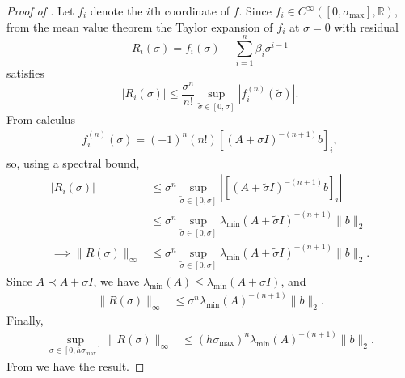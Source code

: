\documentclass[10pt,a4paper]{amsart}
\begin{document}
\begin{proof}[Proof of ]
Let $f_i$ denote the $i$th coordinate of $f$.
Since $f_i \in C^\infty([0,\sigma_{\max}],\mathbb{R})$, from the mean value theorem the Taylor expansion of $f_i$ at $\sigma = 0$ with residual
$$
R_i(\sigma) = f_i(\sigma) - \sum_{ i = 1 }^n \beta_i \sigma^{i-1} 
$$
satisfies 
$$
|R_i(\sigma)| \leq \frac{\sigma^{n}}{n!} \sup_{\tilde{\sigma} \in [0,\sigma]} | f_i^{(n)}(\tilde{\sigma}) |  .
$$
From calculus
\begin{align*}
    f_i^{(n)}(\sigma) = (-1)^n (n!) [ (A + \sigma I)^{-(n+1)} b ]_i ,
\end{align*}
so, using a spectral bound,
\begin{align*}
| R_i(\sigma) | & \leq \sigma^{n} \sup_{ \tilde{\sigma} \in [0,\sigma]} |  [ (A + \tilde{\sigma} I)^{-(n+1)} b ]_i | \\
& \leq \sigma^n \sup_{ \tilde{\sigma} \in [0,\sigma]} \lambda_{\min}(A + \tilde{\sigma} I)^{-(n+1)}  \|b\|_2 \\
\implies \| R(\sigma) \|_\infty & \leq \sigma^n \sup_{ \tilde{\sigma} \in [0,\sigma]} \lambda_{\min}(A + \tilde{\sigma} I)^{-(n+1)} \|b\|_2 .
\end{align*}
Since $A \prec A + \sigma I$, we have $\lambda_{\min}(A) \leq \lambda_{\min}(A + \sigma I)$, and
\begin{align*}
\| R(\sigma) \|_\infty & \leq \sigma^n \lambda_{\min}(A)^{-(n+1)} \|b\|_2 .
\end{align*}
Finally,
\begin{align*}
\sup_{\sigma \in [0,h\sigma_{\max}]} \|R(\sigma)\|_\infty & \leq (h \sigma_{\max})^n \lambda_{\min}(A)^{-(n+1)} \|b\|_2  .
\end{align*}
From  we have the result.
\end{proof}
\end{document}
